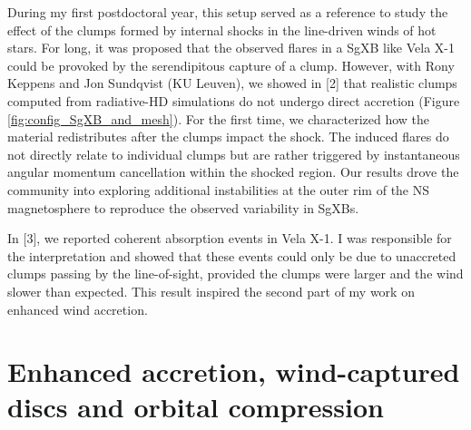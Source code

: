 \documentclass[11pt,onecolumn]{article}
\makeatletter
\newcommand{\sgx}{SgXB\xspace}
\newcommand{\sgxs}{SgXBs\xspace}
\newcommand*{\ns}{NS\@\xspace}
\makeatother
\begin{document}
During my first postdoctoral year, this setup served as a reference to study the effect of the clumps formed by internal shocks in the line-driven winds of hot stars. For long, it was proposed that the observed flares in a \sgx like Vela X-1 could be provoked by the serendipitous capture of a clump. However, with Rony Keppens and Jon Sundqvist (KU Leuven), we showed in [2] that realistic clumps computed from radiative-HD simulations do not undergo direct accretion (Figure\,\,\ref{fig:config_SgXB_and_mesh}). For the first time, we characterized how the material redistributes after the clumps impact the shock. The induced flares do not directly relate to individual clumps but are rather triggered by instantaneous angular momentum cancellation within the shocked region. Our results drove the community into exploring additional instabilities at the outer rim of the \ns magnetosphere to reproduce the observed variability in \sgxs \citep{Bozzo2008}.

In [3], we reported coherent absorption events in Vela X-1. I was responsible for the interpretation and showed that these events could only be due to unaccreted clumps passing by the line-of-sight, provided the clumps were larger and the wind slower than expected. This result inspired the second part of my work on enhanced wind accretion.





\section*{Enhanced accretion, wind-captured discs and orbital compression}
\end{document}
